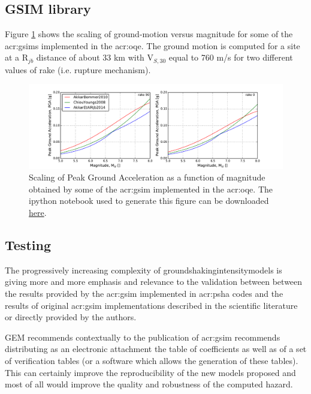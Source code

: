 \subsection{GSIM library}
Figure \ref{fig:gsim_mag_scaling} shows the scaling of ground-motion versus 
magnitude for some of the \glspl{acr:gsim} implemented in the \gls{acr:oqe}.
The ground motion is computed for a site at a R$_{jb}$ distance of about 33 km
with V$_{S,30}$ equal to 760 m/s for two different values of rake (i.e. 
rupture mechanism).
\begin{figure}[hb]
\centering
\includegraphics[trim = 23mm 0mm 23mm 5mm, clip, width=\textwidth]
    {./Pictures/gsim/mag_scaling_example.pdf}
\caption{Scaling of Peak Ground Acceleration as a function of magnitude 
    obtained by some of the \gls{acr:gsim} implemented in the \gls{acr:oqe}. 
    The ipython notebook used to generate this figure can be downloaded  
    \href{https://github.com/GEMScienceTools/hazard_book_2014/tree/lts/notebooks}{here}.}
\label{fig:gsim_mag_scaling}
\end{figure}
%
\subsection{Testing}
%
The progressively increasing complexity of 
\glspl{groundshakingintensitymodel}
is giving more and more emphasis and relevance to the validation between 
between the results provided by the \gls{acr:gsim} implemented in
\gls{acr:psha} codes and the results of original \gls{acr:gsim} 
implementations described in the scientific literature or directly 
provided by the authors.

GEM recommends contextually to the publication of \gls{acr:gsim} recommends
distributing as an electronic attachment the table of coefficients as well 
as of a set of verification tables (or a software which allows the generation 
of these tables). This can certainly improve the reproducibility of the 
new models proposed and most of all would improve the quality and 
robustness of the computed hazard.

